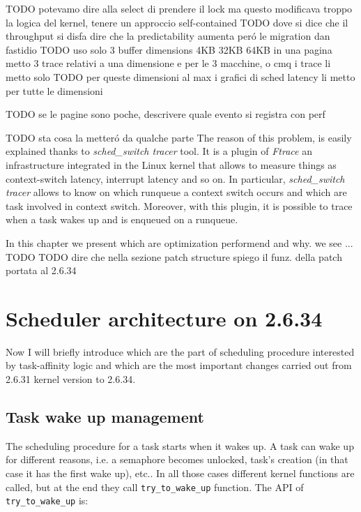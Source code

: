 TODO potevamo dire alla select di prendere il lock ma questo modificava troppo la logica del kernel, tenere un approccio self-contained
TODO dove si dice che il throughput si disfa dire che la predictability aumenta per\'o le migration dan fastidio
TODO uso solo 3 buffer dimensions 4KB 32KB 64KB in una pagina metto 3 trace relativi a una dimensione e per le 3 macchine, o cmq i trace li metto solo
TODO per queste dimensioni al max i grafici di sched latency li metto per tutte le dimensioni

TODO se le pagine sono poche, descrivere quale evento si registra con perf



TODO sta cosa la metter\'o da qualche parte
The reason of this problem, is easily explained thanks to \textit{sched\_switch tracer} tool. It is a plugin of \textit{Ftrace} an infrastructure integrated
in the Linux kernel that allows to measure things as context-switch latency, interrupt latency and so on. In particular, \textit{sched\_switch tracer} 
allows to know on which runqueue a context switch occurs and which are task involved in context switch. Moreover, with this plugin, it is possible to 
trace when a task wakes up and is enqueued on a runqueue.





In this chapter we present which are optimization performend and why. we see ... TODO 
TODO dire che nella sezione patch structure spiego il funz. della patch portata al 2.6.34

\section{Scheduler architecture on 2.6.34}

Now I will briefly introduce which are the part of scheduling procedure 
interested by task-affinity logic and which are the most important changes 
carried out from 2.6.31 kernel version to 2.6.34.

\subsection{Task wake up management}

The scheduling procedure for a task starts when it wakes up. A task can wake up
for different reasons, i.e. a semaphore becomes unlocked, task's creation
(in that case it has the first wake up), etc.. In all those cases different
kernel functions are called, but at the end they call 
\texttt{try\_to\_wake\_up} function. The API of \texttt{try\_to\_wake\_up} is:

